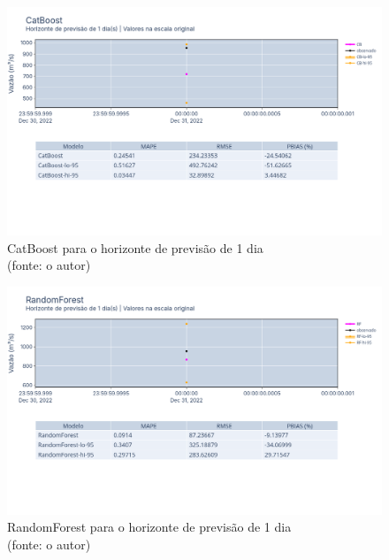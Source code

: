 \begin{figure}[!h]
	\centering
	\includegraphics[scale=0.33]{Figuras/jequiti/resultados/CatBoost_fh1.png}
	\caption{CatBoost para o horizonte de previsão de 1 dia\\(fonte: o autor)}
	\label{fig:jequiti_CatBoostRegressor_fh1}
\end{figure}

\begin{figure}[!h]
	\centering
	\includegraphics[scale=0.33]{Figuras/jequiti/resultados/RandomForest_fh1.png}
	\caption{RandomForest para o horizonte de previsão de 1 dia\\(fonte: o autor)}
	\label{fig:jequiti_RandomForest_fh1}
\end{figure}

